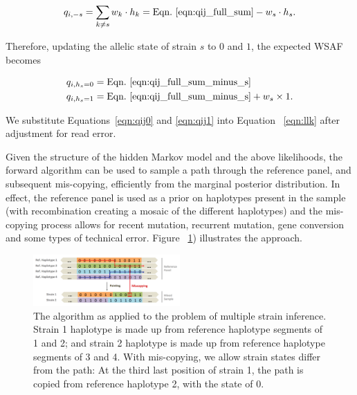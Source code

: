 \documentclass{bioinfo}
\begin{document}
\begin{equation}
q_{i,-s} = \sum_{k\neq s} w_k \cdot h_k = \textrm{Eqn.~\eqref{eqn:qij_full_sum}} -  w_s \cdot h_s. \label{eqn:qij_full_sum_minus_s}
\end{equation}

\noindent Therefore, updating the allelic state of strain $s$ to $0$ and $1$, the expected WSAF becomes

\begin{align}
q_{i,h_s=0} & = \textrm{Eqn.~\eqref{eqn:qij_full_sum_minus_s}} \label{eqn:qij0}\\
q_{i,h_s=1} & = \textrm{Eqn.~\eqref{eqn:qij_full_sum_minus_s}} + w_s \times 1. \label{eqn:qij1}
\end{align}

\noindent We substitute Equations~\eqref{eqn:qij0} and \eqref{eqn:qij1} into Equation ~\eqref{eqn:llk} after adjustment for read error.

Given the structure of the hidden Markov model and the above likelihoods, the forward algorithm can be used to sample a path through the reference panel, and subsequent mis-copying, efficiently from the marginal posterior distribution.  In effect, the reference panel is used as a prior on haplotypes present in the sample (with recombination creating a mosaic of the different haplotypes) and the mis-copying process allows for recent mutation, recurrent mutation, gene conversion and some types of technical error.  Figure ~\ref{fig:ls}) illustrates the approach.


\begin{figure}[tbh]
\centering
\includegraphics[width=0.5\textwidth]{coupled-painting.png}
\caption{The \citet{Li2003} algorithm as applied to the problem of multiple strain inference. Strain 1 haplotype is made up from reference haplotype segments of 1 and 2; and strain 2 haplotype is made up from reference haplotype segments of 3 and 4. With mis-copying, we allow strain states differ from the path: At the third last position of strain 1, the path is copied from reference haplotype 2, with the state of 0.}
\label{fig:ls}
\end{figure}
\end{document}

